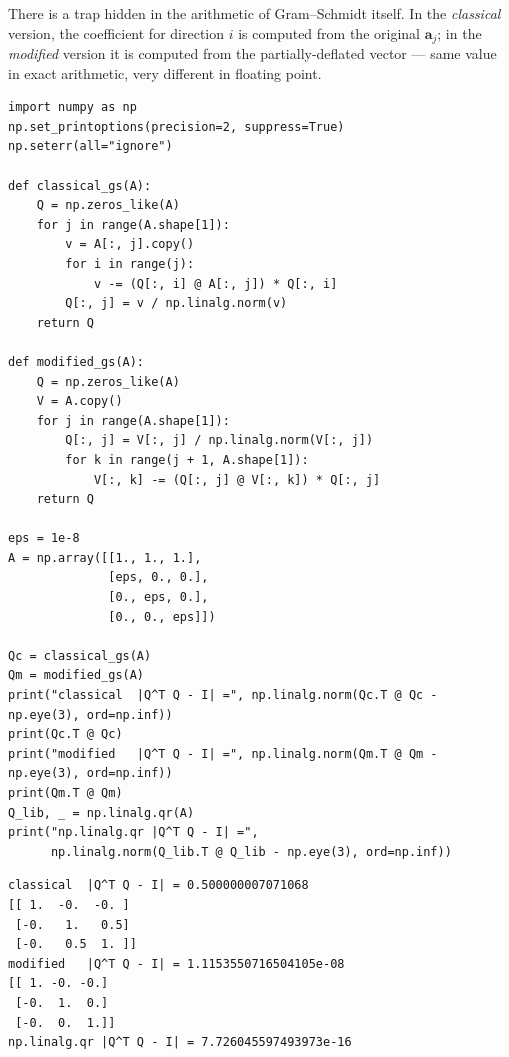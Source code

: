 There is a trap hidden in the arithmetic of Gram--Schmidt itself. In the
\emph{classical} version, the coefficient for direction $i$ is computed
from the original $\mathbf a_j$; in the \emph{modified} version it is
computed from the partially-deflated vector --- same value in exact
arithmetic, very different in floating point.

\begin{lstlisting}[caption={\ttfamily code/ch05\_gs\_stability.py ---
classical vs.\ modified Gram--Schmidt on nearly-parallel columns
($\varepsilon=10^{-8}$). Measures orthogonality drift as
$\|Q^{T}Q-I\|_\infty$.}]
import numpy as np
np.set_printoptions(precision=2, suppress=True)
np.seterr(all="ignore")

def classical_gs(A):
    Q = np.zeros_like(A)
    for j in range(A.shape[1]):
        v = A[:, j].copy()
        for i in range(j):
            v -= (Q[:, i] @ A[:, j]) * Q[:, i]
        Q[:, j] = v / np.linalg.norm(v)
    return Q

def modified_gs(A):
    Q = np.zeros_like(A)
    V = A.copy()
    for j in range(A.shape[1]):
        Q[:, j] = V[:, j] / np.linalg.norm(V[:, j])
        for k in range(j + 1, A.shape[1]):
            V[:, k] -= (Q[:, j] @ V[:, k]) * Q[:, j]
    return Q

eps = 1e-8
A = np.array([[1., 1., 1.],
              [eps, 0., 0.],
              [0., eps, 0.],
              [0., 0., eps]])

Qc = classical_gs(A)
Qm = modified_gs(A)
print("classical  |Q^T Q - I| =", np.linalg.norm(Qc.T @ Qc - np.eye(3), ord=np.inf))
print(Qc.T @ Qc)
print("modified   |Q^T Q - I| =", np.linalg.norm(Qm.T @ Qm - np.eye(3), ord=np.inf))
print(Qm.T @ Qm)
Q_lib, _ = np.linalg.qr(A)
print("np.linalg.qr |Q^T Q - I| =",
      np.linalg.norm(Q_lib.T @ Q_lib - np.eye(3), ord=np.inf))
\end{lstlisting}

\begin{lstlisting}[caption={Output of the stability test. Notice classical
Gram--Schmidt loses \emph{half a unit} of orthogonality while modified loses
$10^{-8}$, and the library QR (Householder reflectors) is exact to machine
precision. This is not a toy gap --- it is why nobody ships classical
Gram--Schmidt.}]
classical  |Q^T Q - I| = 0.500000007071068
[[ 1.  -0.  -0. ]
 [-0.   1.   0.5]
 [-0.   0.5  1. ]]
modified   |Q^T Q - I| = 1.1153550716504105e-08
[[ 1. -0. -0.]
 [-0.  1.  0.]
 [-0.  0.  1.]]
np.linalg.qr |Q^T Q - I| = 7.726045597493973e-16
\end{lstlisting}

